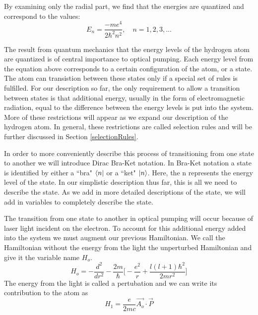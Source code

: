 \documentclass[letter,12pt]{article}
\begin{document}
		By examining only the radial part, we find that the energies
		are quantized and correspond to the values:
		\begin{equation}
			E_n=\frac{-me^4}{2\hbar^2n^2},\quad n=1,2,3,...
		\end{equation}

		The result from quantum mechanics that the energy levels 
		of the hydrogen atom are 
		quantized is of central importance to optical pumping. 
		Each energy level from the equation above 
		corresponds to a certain configuration of the 
		atom, or a state. The atom can transistion 
        between these states
		only if a special set of rules is fulfilled. 
        For our description so far, the only requirement
        to allow a transition between states
        is that additional energy, usually in the 
        form of electromagnetic radiation, 
        equal to the difference
        between the energy levels is put into the system. 
        More of these restrictions will appear as we
        expand our description of the hydrogen atom.
        In general, these restrictions 
        are called selection rules and will be further
        discussed in 
        Section \ref{selectionRules}.

        In order to more conveniently describe 
        this process of transitioning from one state to another
        we will introduce Dirac Bra-Ket notation. In 
        Bra-Ket notation a state is identified by 
        either a ``bra" $\bra{n}$
        or a ``ket" $\ket{n}$. Here, the n represents the energy
		level of the state. In our simplistic description thus far, 
		this is all we need to describe the state.
		As we add in more detailed descriptions of 
		the state, we will add in variables to completely 
		describe the state.

		The transition from one state to another in optical pumping
		will occur because of laser light incident on the electron.
		To account for this additional energy added into the system 
		we must augment
		our previous Hamiltonian. We call the Hamiltonian without 
		the energy from the light the unperturbed Hamiltonian and 
		give it the variable name $H_o$.
		\begin{equation}
			H_o=-\frac{d^2}{dr^2}-\frac{2m}{\hbar}\Big[-\frac{e^2}{r} + \frac{l(l+1)\hbar^2}{2mr^2}\Big]
		\end{equation}
		The energy from the light is called a pertubation and we
		can write its contribution to the atom as 
		\begin{equation}
			H_1=\frac{e}{2mc} \vec{A_o} \cdotp \vec{P}
		\end{equation}
\end{document}
